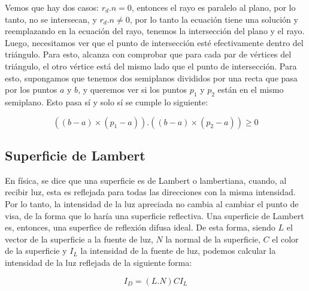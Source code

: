 Vemos que hay dos casos: $r_d . n = 0$, entonces el rayo es paralelo al plano, por lo tanto, no se intersecan, y $r_d . n \neq 0$, por lo tanto la ecuación tiene una solución y reemplazando en la ecuación del rayo, tenemos la intersección del plano y el rayo.\\
Luego, necesitamos ver que el punto de intersección esté efectivamente dentro del triángulo. Para esto, alcanza con comprobar que para cada par de vértices del triángulo, el otro vértice está del mismo lado que el punto de intersección. Para esto, supongamos que tenemos dos semiplanos divididos por una recta que pasa por los puntos $a$ y $b$, y queremos ver si los puntos $p_1$ y $p_2$ están en el mismo semiplano. Esto pasa sí y solo sí se cumple lo siguiente:

\begin{equation}
((b - a) \times (p_1 - a)) . ((b - a) \times (p_2 - a)) \geq 0
\end{equation}

\subsection{Superficie de Lambert}

En física, se dice que una superficie es de Lambert o lambertiana, cuando, al recibir luz, esta es reflejada para todas las direcciones con la misma intensidad. Por lo tanto, la intensidad de la luz apreciada no cambia al cambiar el punto de visa, de la forma que lo haría una superficie reflectiva. Una superficie de Lambert es, entonces, una superfice de reflexión difusa ideal. De esta forma, siendo $L$ el vector de la superficie a la fuente de luz, $N$ la normal de la superficie, $C$ el color de la superficie y $I_L$ la intensidad de la fuente de luz, podemos calcular la intensidad de la luz reflejada de la siguiente forma:

\begin{equation}
I_D = (L.N)CI_L
\end{equation}